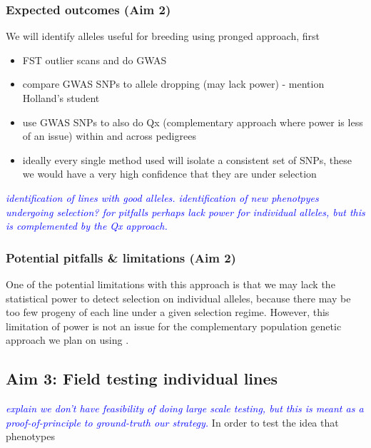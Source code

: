 \documentclass[draft,12pt]{article}
\newcommand{\jri}[1]{\textcolor{blue}{ \emph{\scriptsize  #1}} }
\begin{document}
\subsubsection*{Expected outcomes (Aim 2)}
We will identify alleles useful for breeding using pronged approach, first
\begin{itemize}
	\item FST outlier scans and do GWAS
	\item compare GWAS SNPs to allele dropping (may lack power) - mention Holland's student
	\item use GWAS SNPs to also do Qx (complementary approach where power is less of an issue) within and across pedigrees
	\item ideally every single method used will isolate a consistent set of SNPs, these we would have a very high confidence that they are under selection
\end{itemize}

\jri{identification of lines with good alleles. identification of new phenotpyes undergoing selection? for pitfalls perhaps lack power for individual alleles, but this is complemented by the Qx approach.}

\subsubsection{Potential pitfalls \& limitations (Aim 2)}
One of the potential limitations with this approach is that we may lack the statistical power to detect selection on individual alleles, because there may be too few progeny of each line under a given selection regime. 
However, this limitation of power is not an issue for the complementary population genetic approach we plan on using \cite{Berg:2014bs}.

\subsection*{Aim 3: Field testing individual lines}
\jri{explain we don't have feasibility of doing large scale testing, but this is meant as a proof-of-principle to ground-truth our strategy. }
In order to test the idea that phenotypes


\end{document}
